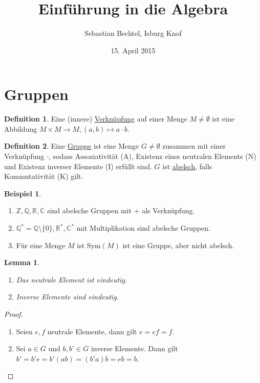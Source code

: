 \documentclass[12pt]{scrartcl}%
\newtheorem{lemma}{Lemma}
\theoremstyle{definition}
\newtheorem*{defn}{Definition}
\newtheorem{ex}{Beispiel}
\theoremstyle{remark}
\newcommand{\sym}{\text{Sym}}
\begin{document}
\author{Sebastian Bechtel, Isburg Knof}
\title{Einführung in die Algebra}
\date{15. April 2015}

\maketitle %

\section{Gruppen}

\begin{defn}
    Eine (innere) \underline{Verknüpfung} auf einer Menge $M\neq \emptyset$ ist eine Abbildung $M\times M\to M, (a,b)\mapsto a\cdot b$.
\end{defn}

\begin{defn}
    Eine \underline{Gruppe} ist eine Menge $G\neq \emptyset$ zusammen mit einer Verknüpfung $\cdot$, sodass Assoziativität (A), Existenz eines neutralen Elements (N) und Existenz inverser Elemente (I) erfüllt sind. $G$ ist \underline{abelsch}, falls Kommutativität (K) gilt.
\end{defn}

\begin{ex}
    \begin{enumerate}
        \item $\mathbb{Z}, \mathbb{Q}, \mathbb{R}, \mathbb{C}$ sind abelsche Gruppen mit $+$ als Verknüpfung.
        \item $\mathbb{Q}^*=\mathbb{Q}\setminus \{0\}, \mathbb{R}^*, \mathbb{C}^*$ mit Multiplikation sind abelsche Gruppen.
        \item Für eine Menge $M$ ist $\sym(M)$ ist eine Gruppe, aber nicht abelsch.
    \end{enumerate}
\end{ex}

\begin{lemma}
    \begin{enumerate}[label=\alph*)]
        \item Das neutrale Element ist eindeutig.
        \item Inverse Elemente sind eindeutig.
    \end{enumerate}
\end{lemma}

\begin{proof}
    \begin{enumerate}[label=\alph*)]
        \item Seien $e,f$ neutrale Elemente, dann gilt $e=ef=f$.
        \item Sei $a\in G$ und $b,b'\in G$ inverse Elemente. Dann gilt $b'=b'e=b'(ab)=(b'a)b=eb=b$. 
    \end{enumerate}
\end{proof}
\end{document}
